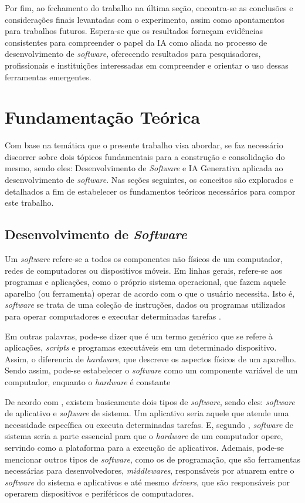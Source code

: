 \documentclass[english,brazilian]{UNISINOSartigo} %
\begin{document}
Por fim, ao fechamento do trabalho na última seção, encontra-se as conclusões e considerações finais levantadas com o experimento, assim como apontamentos para trabalhos futuros. Espera-se que os resultados forneçam evidências consistentes para compreender o papel da IA como aliada no processo de desenvolvimento de \textit{software}, oferecendo resultados para pesquisadores, profissionais e instituições interessadas em compreender e orientar o uso dessas ferramentas emergentes.

\section{Fundamentação Teórica}

Com base na temática que o presente trabalho visa abordar, se faz necessário discorrer sobre dois tópicos fundamentais para a construção e consolidação do mesmo, sendo eles: Desenvolvimento de \textit{Software} e IA Generativa aplicada ao desenvolvimento de \textit{software}. Nas seções seguintes, os conceitos são explorados e detalhados a fim de estabelecer os fundamentos teóricos necessários para compor este trabalho.

\subsection{Desenvolvimento de \textit{Software}}

Um \textit{software} refere-se a todos os componentes não físicos de um computador, redes de computadores ou dispositivos móveis. Em linhas gerais, refere-se aos programas e aplicações, como o próprio sistema operacional, que fazem aquele aparelho (ou ferramenta) operar de acordo com o que o usuário necessita. Isto é, \textit{software} se trata de uma coleção de instruções, dados ou programas utilizados para operar computadores e executar determinadas tarefas \cite{coutinho2021}.

Em outras palavras, pode-se dizer que é um termo genérico que se refere à aplicações, \textit{scripts} e programas executáveis em um determinado dispositivo. Assim, o diferencia de \textit{hardware}, que descreve os aspectos físicos de um aparelho. Sendo assim, pode-se estabelecer o \textit{software} como um componente variável de um computador, enquanto o \textit{hardware} é constante \cite{sakurai2018}

De acordo com , existem basicamente dois tipos de \textit{software}, sendo eles: \textit{software} de aplicativo e \textit{software} de sistema. Um aplicativo seria aquele que atende uma necessidade específica ou executa determinadas tarefas. E, segundo , \textit{software} de sistema seria a parte essencial para que o \textit{hardware} de um computador opere, servindo como a plataforma para a execução de aplicativos. Ademais, pode-se mencionar outros tipos de \textit{software}, como os de programação, que são ferramentas necessárias para desenvolvedores, \textit{middlewares}, responsáveis por atuarem entre o \textit{software} do sistema e aplicativos e até mesmo \textit{drivers}, que são responsáveis por operarem dispositivos e periféricos de computadores.
\end{document}
